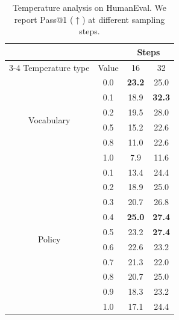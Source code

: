 \begin{table}[h]
\centering
\caption{Temperature analysis on HumanEval. We report Pass@1 ($\uparrow$) at different sampling steps.}
\setlength{\tabcolsep}{4.5pt}
\begin{tabular}{cccc}
\toprule
& & \multicolumn{2}{c}{Steps} \\
\cmidrule(lr){3-4}
Temperature type & Value & 16 & 32 \\
\midrule
\multirow{6}{*}{Vocabulary}
& 0.0 & \textbf{23.2} & 25.0 \\
& 0.1 & 18.9 & \textbf{32.3} \\
& 0.2 & 19.5 & 28.0 \\
& 0.5 & 15.2 & 22.6 \\
& 0.8 & 11.0 & 22.6 \\
& 1.0 & 7.9 & 11.6 \\
\midrule
\multirow{10}{*}{Policy}
& 0.1 & 13.4 & 24.4 \\
& 0.2 & 18.9 & 25.0 \\
& 0.3 & 20.7 & 26.8 \\
& 0.4 & \textbf{25.0} & \textbf{27.4} \\
& 0.5 & 23.2 & \textbf{27.4} \\
& 0.6 & 22.6 & 23.2 \\
& 0.7 & 21.3 & 22.0 \\
& 0.8 & 20.7 & 25.0 \\
& 0.9 & 18.3 & 23.2 \\
& 1.0 & 17.1 & 24.4 \\
\bottomrule
\end{tabular}
\label{tab:temp-humaneval}
\end{table}














